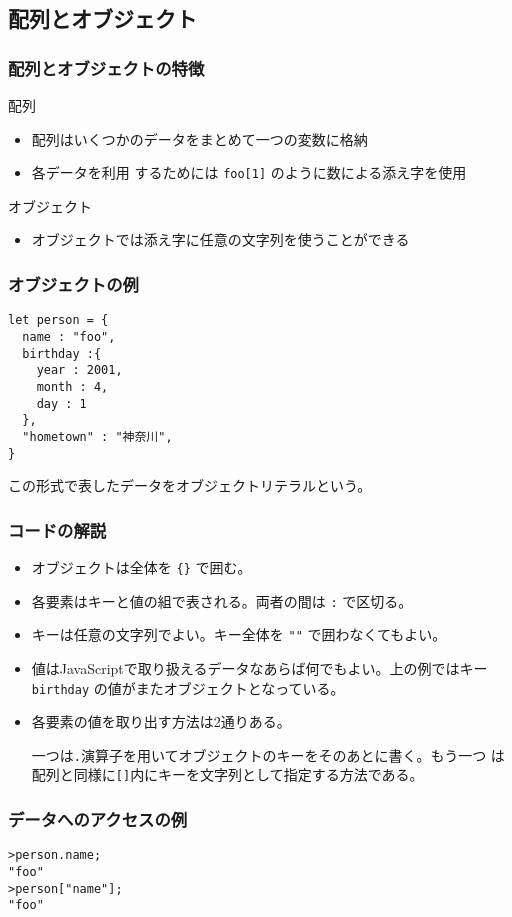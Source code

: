 \subsection{配列とオブジェクト}
\begin{frame}[containsverbatim]
\frametitle{配列とオブジェクトの特徴}
配列
\begin{itemize}
 \item 配列はいくつかのデータをまとめて一つの変数に格納
 \item 各データを利用
するためには \Verb+foo[1]+ のように数による添え字を使用
\end{itemize}
オブジェクト
\begin{itemize}
 \item オブジェクトでは添え字に任意の文字列を使うことができる
\end{itemize}
\end{frame}
\begin{frame}[containsverbatim]
\frametitle{オブジェクトの例}
\begin{Verbatim}
let person = {
  name : "foo",
  birthday :{
    year : 2001,
    month : 4,
    day : 1
  },
  "hometown" : "神奈川",
}
\end{Verbatim}
この形式で表したデータをオブジェクトリテラルという。
\end{frame}
\begin{frame}[containsverbatim]
\frametitle{コードの解説}
\begin{itemize}
 \item オブジェクトは全体を \Verb+{}+ で囲む。
 \item 各要素はキーと値の組で表される。両者の間は \Verb+:+ で区切る。
 \item キーは任意の文字列でよい。キー全体を \Verb+""+ で囲わなくてもよい。
 \item 値はJavaScriptで取り扱えるデータなあらば何でもよい。上の例ではキー
       \Verb+birthday+ の値がまたオブジェクトとなっている。
 \item 各要素の値を取り出す方法は2通りある。

一つは\Verb+.+演算子を用いてオブジェクトのキーをそのあとに書く。もう一つ
       は配列と同様に\Verb+[]+内にキーを文字列として指定する方法である。
\end{itemize}
\end{frame}
\begin{frame}[containsverbatim]
\frametitle{データへのアクセスの例}
\begin{Verbatim}
>person.name;
"foo"
>person["name"];
"foo"
\end{Verbatim}
\end{frame}
